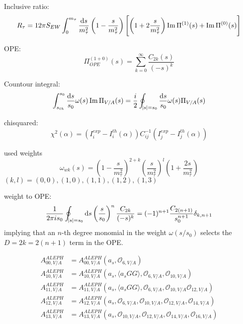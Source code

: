 \documentclass{article}
\begin{document}
  Inclusive ratio:
  \begin{equation}
    R_{\tau} = 12 \pi S_{EW} \int_0^{m_\tau} \frac{\dif s}{m_\tau^2} \left( 1 - \frac{s}{m_\tau^2}\right) \left[ \left( 1+2\frac{s}{m_\tau^2} \right) \operatorname{Im} \Pi^{(1)}(s) + \operatorname{Im} \Pi^{(0)}(s)\right]
  \end{equation}

  OPE:
  \begin{equation}
    \Pi_{OPE}^{(1+0)}(s) = \sum_{k=0}^{\infty}\frac{C_{2k}(s)}{(-s)^k}
  \end{equation}
  

  Countour integral:
  \begin{equation}
    \int_{s_{th}}^{s_0} \frac{\dif s}{s_0} \omega(s) \operatorname{Im} \Pi_{V/A}(s) = \frac{i}{2} \oint_{\envert{s}=s_0} \frac{\dif s}{s_0} \omega(s) \Pi_{V/A}(s)
  \end{equation}

  chisquared:
  \begin{equation}
    \chi^2(\alpha) = (I_i^{exp}-I_i^{th}(\alpha)) C_{ij}^{-1} (I_j^{exp}-I_j^{th}(\alpha))
  \end{equation}

  used weights
  \begin{equation}
    \omega_{wk}(s) = \left( 1 - \frac{s}{m_\tau^2} \right)^{2+k} \left( \frac{s}{m_\tau^2} \right)^l \left( 1 + \frac{2s}{m_\tau^2} \right)
  \end{equation}
  $(k,l) = {(0,0), (1,0), (1,1), (1,2), (1,3)}$

  weight to OPE:
  \begin{equation}
    \frac{1}{2 \pi i s_0} \oint_{\envert{s}=s_0} \dif s \left( \frac{s}{s_0} \right)^n \frac{C_{2k}}{(-s)^k} = (-1)^{n+1} \frac{C_{2(n+1)}}{s_0^{n+1}} \delta_{k,n+1}
  \end{equation}
  implying that an $n$-th degree monomial in the weight $\omega(s/s_0)$ selects
  the $D=2k=2(n+1)$ term in the OPE.

  \begin{equation}
    \begin{split}
      A_{00,V/A}^{ALEPH} &= A_{00,V/A}^{ALEPH}(a_s, \mathcal{O}_{6,V/A}) \\
      A_{10,V/A}^{ALEPH} &= A_{10,V/A}^{ALEPH}(a_s,\langle a_s GG \rangle, \mathcal{O}_{6,V/A}, \mathcal{O}_{10,V/A}) \\
      A_{11,V/A}^{ALEPH} &= A_{11,V/A}^{ALEPH}(a_s,\langle a_s GG \rangle, \mathcal{O}_{6,V/A}, \mathcal{O}_{10,V/A} \mathcal{O}_{12,V/A}) \\
      A_{12,V/A}^{ALEPH} &= A_{12,V/A}^{ALEPH}(a_s, \mathcal{O}_{6,V/A}, \mathcal{O}_{10,V/A}, \mathcal{O}_{12,V/A}, \mathcal{O}_{14,V/A}) \\
      A_{13,V/A}^{ALEPH} &= A_{13,V/A}^{ALEPH}(a_s, \mathcal{O}_{10,V/A}, \mathcal{O}_{12,V/A}, \mathcal{O}_{14,V/A}, \mathcal{O}_{16,V/A})
    \end{split} 
  \end{equation}
\end{document}
